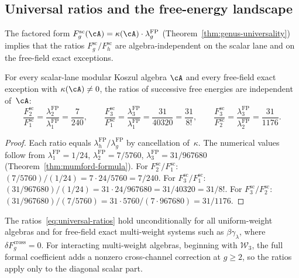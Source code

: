 \subsection{Universal ratios and the free-energy landscape}
\label{subsec:universal-ratios-landscape}

The factored form
$F_g^{\mathrm{sc}}(\cA)
= \kappa(\cA) \cdot \lambda_g^{\mathrm{FP}}$
(Theorem~\ref{thm:genus-universality}) implies that the ratios
$F_g^{\mathrm{sc}}/F_h^{\mathrm{sc}}$ are algebra-independent on the scalar lane and on the
free-field exact exceptions.

\begin{proposition}
\label{prop:universal-fe-ratios}
For every scalar-lane modular Koszul algebra $\cA$ and every
free-field exact exception with
$\kappa(\cA) \neq 0$, the ratios of successive free energies are
independent of~$\cA$\textup{:}
\begin{equation}\label{eq:universal-ratios}
\frac{F_2^{\mathrm{sc}}}{F_1^{\mathrm{sc}}}
= \frac{\lambda_2^{\mathrm{FP}}}{\lambda_1^{\mathrm{FP}}}
= \frac{7}{240},
\qquad
\frac{F_3^{\mathrm{sc}}}{F_1^{\mathrm{sc}}}
= \frac{\lambda_3^{\mathrm{FP}}}{\lambda_1^{\mathrm{FP}}}
= \frac{31}{40320}
= \frac{31}{8!},
\qquad
\frac{F_3^{\mathrm{sc}}}{F_2^{\mathrm{sc}}}
= \frac{\lambda_3^{\mathrm{FP}}}{\lambda_2^{\mathrm{FP}}}
= \frac{31}{1176}.
\end{equation}
\end{proposition}

\begin{proof}
Each ratio equals $\lambda_h^{\mathrm{FP}} / \lambda_g^{\mathrm{FP}}$
by cancellation of~$\kappa$. The numerical values follow from
$\lambda_1^{\mathrm{FP}} = 1/24$,
$\lambda_2^{\mathrm{FP}} = 7/5760$,
$\lambda_3^{\mathrm{FP}} = 31/967680$
(Theorem~\ref{thm:mumford-formula}).
For $F_2^{\mathrm{sc}}/F_1^{\mathrm{sc}}$:
$(7/5760)/(1/24) = 7 \cdot 24/5760 = 7/240$.
For $F_3^{\mathrm{sc}}/F_1^{\mathrm{sc}}$:
$(31/967680)/(1/24) = 31 \cdot 24/967680 = 31/40320 = 31/8!$.
For $F_3^{\mathrm{sc}}/F_2^{\mathrm{sc}}$:
$(31/967680)/(7/5760) = 31 \cdot 5760/(7 \cdot 967680) = 31/1176$.
\end{proof}

\begin{remark}\label{rem:universal-ratio-scope}

The ratios~\eqref{eq:universal-ratios} hold unconditionally for all
uniform-weight algebras and for free-field exact multi-weight
systems such as $\beta\gamma_\lambda$, where
$\delta F_g^{\mathrm{cross}}=0$. For interacting multi-weight
algebras, beginning with $\mathcal{W}_3$, the full formal coefficient
adds a nonzero cross-channel correction at $g\geq2$, so the
ratios apply only to the diagonal scalar part.
\end{remark}

